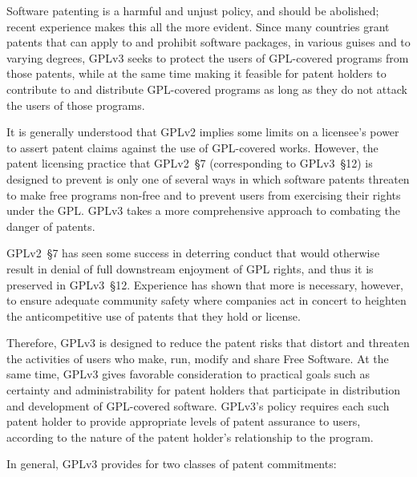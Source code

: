 Software patenting is a harmful and unjust policy, and should be abolished;
recent experience makes this all the more evident. Since many countries grant
patents that can apply to and prohibit software packages, in various guises
and to varying degrees, GPLv3 seeks to protect the users of GPL-covered programs
from those patents, while at the same time making it feasible for patent
holders to contribute to and distribute GPL-covered programs as long as they
do not attack the users of those programs.

It is generally understood that GPLv2 implies some limits on a licensee's
power to assert patent claims against the use of GPL-covered works.
However, the patent licensing practice that GPLv2~\S7 (corresponding to
GPLv3~\S12) is designed to prevent is only one of several ways in which
software patents threaten to make free programs non-free and to prevent users
from exercising their rights under the GPL. GPLv3 takes a more comprehensive
approach to combating the danger of patents.

GPLv2~\S7 has seen some success in deterring conduct that would otherwise
result in denial of full downstream enjoyment of GPL rights, and thus it is
preserved in GPLv3~\S12.  Experience has shown that more is necessary,
however, to ensure adequate community safety where companies act in concert
to heighten the anticompetitive use of patents that they hold or license.

Therefore,  GPLv3 is designed to reduce the patent risks that distort and
threaten the activities of users who make, run, modify and share Free
Software.  At the same time, GPLv3 gives favorable consideration to practical
goals such as certainty and administrability for patent holders that
participate in distribution and development of GPL-covered software.  GPLv3's
policy requires each such patent holder to provide appropriate levels of
patent assurance to users, according to the nature of the patent holder's
relationship to the program.

In general, GPLv3 provides for two classes of patent commitments:

